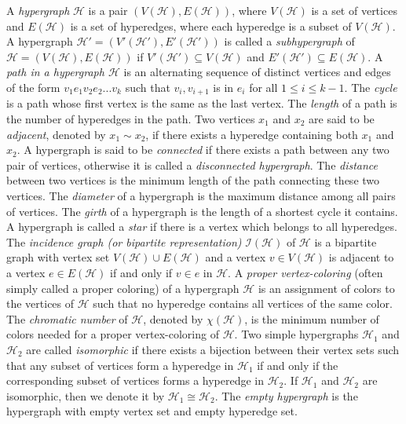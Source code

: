 \documentclass[11pt,a4paper]{article}
\theoremstyle{definition}
\theoremstyle{remark}
\begin{document}
		
		A \textit{hypergraph} $\mathcal{H}$ is a pair $(V(\mathcal{H}),E(\mathcal{H}))$, where $V(\mathcal{H})$ is a set of  vertices and $E(\mathcal{H})$ is a set of hyperedges, where each hyperedge is a subset of $V(\mathcal{H})$. A hypergraph $\mathcal{H}'=(V'(\mathcal{H}'),E'(\mathcal{H}'))$   is called a \textit{subhypergraph} of  $\mathcal{H} = (V(\mathcal{H}),E(\mathcal{H}))$ if  $V'(\mathcal{H}')  \subseteq V(\mathcal{H})$ and $E'(\mathcal{H}') \subseteq E(\mathcal{H})$. A \textit{path in a hypergraph $\mathcal{H}$} is an alternating sequence of distinct
	vertices and edges of the form $v_1e_1v_2e_2...v_k$ such that $v_i,v_{i+1}$ is in $e_i$ for all $1 \leq i \leq k-1$. The \textit{cycle} 
	is a path whose first vertex is the same as the last vertex. The \textit{length} of a path is the
	number of hyperedges in the path. Two vertices $x_1$ and $x_2$ are said to be \textit{adjacent}, denoted by $x_1 \sim x_2$, if there exists a hyperedge containing both $x_1$ and $x_2$.  A hypergraph is said to be \textit{connected} if there exists a path between any two pair of vertices, otherwise 
	it is called a \textit{disconnected hypergraph}. The \textit{distance} between two vertices is the minimum length of the 
	path connecting these two vertices. The \textit{diameter} of a hypergraph is the maximum 
	distance among all pairs of vertices.  The \textit{girth} of a hypergraph is the length of a shortest cycle it contains. A hypergraph is called a \textit{star} if there is a vertex which belongs to all hyperedges.  
	The \textit{incidence graph (or bipartite representation)} $\mathcal{I}(\mathcal{H})$ of $\mathcal{H}$ is a bipartite graph with vertex set $V(\mathcal{H}) \cup E(\mathcal{H})$ and a vertex $v \in V(\mathcal{H}) $ is adjacent to a vertex $e \in E(\mathcal{H})$ if and only if $v \in e$ in $\mathcal{H}$. 	A \textit{proper vertex-coloring} (often simply called a proper coloring) of a hypergraph
	$\mathcal{H}$ is an assignment of colors to the vertices of $\mathcal{H}$ such that no hyperedge contains all vertices of the
	same color. The \textit{chromatic number} of $\mathcal{H}$, denoted by $\chi(\mathcal{H})$, is the minimum
	number of colors needed for a proper vertex-coloring of $\mathcal{H}$. Two simple hypergraphs $\mathcal{H}_1$ and $\mathcal{H}_2$ are called \textit{isomorphic} if there exists a bijection between their vertex sets such that any subset of vertices form a hyperedge in $\mathcal{H}_1$ if and only if the corresponding subset of vertices forms a hyperedge in $\mathcal{H}_2$. If $\mathcal{H}_1$ and $\mathcal{H}_2$ are isomorphic, then we denote it by $\mathcal{H}_1\cong\mathcal{H}_2$. The \textit{empty hypergraph} is the hypergraph with empty vertex set and empty hyperedge set.
	
\end{document}
